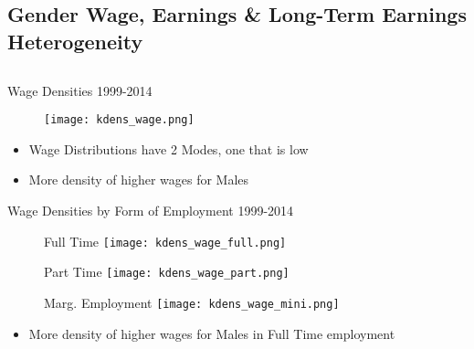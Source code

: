 \documentclass[hyperref={bookmarks=false}]{beamer}
\begin{document}
\begin{appendix}
\section{Gender Wage, Earnings \& Long-Term Earnings Heterogeneity}
\subsection{}

\begin{frame}
\label{FEMHET}
\end{frame}

\begin{frame}{Wage Densities}
1999-2014
\begin{figure}[!t]
\centering
\begin{minipage}[b]{0.32\textwidth}{}
\centering
\texttt{[image: kdens\_wage.png]}
\end{minipage}
\end{figure}
\begin{itemize}
\setlength{\itemsep}{0.7 cm}
\item Wage Distributions have 2 Modes, one that is low
\item More density of higher wages for Males
\end{itemize}
\end{frame}

\begin{frame}{Wage Densities by Form of Employment}
1999-2014
\begin{figure}[!t]
\centering
\begin{minipage}[b]{0.32\textwidth}{Full Time}
\centering
\texttt{[image: kdens\_wage\_full.png]}
\end{minipage}
\begin{minipage}[b]{0.32\textwidth}{Part Time}
\centering
\texttt{[image: kdens\_wage\_part.png]}
\end{minipage}
\begin{minipage}[b]{0.32\textwidth}{Marg. Employment}
\centering
\texttt{[image: kdens\_wage\_mini.png]}
\end{minipage}
\end{figure}
\begin{itemize}
\setlength{\itemsep}{0.7 cm}
\item More density of higher wages for Males in Full Time employment
\end{itemize}
\end{frame}


\end{appendix}
\end{document}
